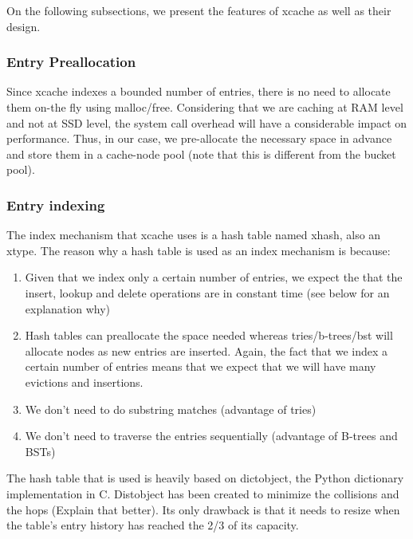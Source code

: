 On the following subsections, we present the features of xcache as well as 
their design.

\subsubsection{Entry Preallocation}\label{sec:xcache-entry-design}

Since xcache indexes a bounded number of entries, there is no need to allocate 
them on-the fly using malloc/free. Considering that we are caching at RAM level 
and not at SSD level, the system call overhead will have a considerable impact 
on performance. Thus, in our case, we pre-allocate the necessary space in 
advance and store them in a cache-node pool (note that this is different from 
the bucket pool).

\subsubsection{Entry indexing}\label{sec:xcache-index-design}

The index mechanism that xcache uses is a hash table named xhash, also an 
xtype. The reason why a hash table is used as an index mechanism is because:

\begin{enumerate}
	\item Given that we index only a certain number of entries, we expect 
		the that the insert, lookup and delete operations are in 
		constant time (see below for an explanation why)
	\item Hash tables can preallocate the space needed whereas 
		tries/b-trees/bst will allocate nodes as new entries are 
		inserted. Again, the fact that we index a certain number of 
		entries means that we expect that we will have many evictions 
		and insertions.
	\item We don't need to do substring matches (advantage of tries)
	\item We don't need to traverse the entries sequentially (advantage of 
		B-trees and BSTs)
\end{enumerate}

The hash table that is used is heavily based on dictobject\cite{dictobject},
the Python dictionary implementation in C. Distobject has been created to 
minimize the collisions and the hops (\fixme Explain that better). Its only 
drawback is that it needs to resize when the table's entry history has reached 
the 2/3 of its capacity.

